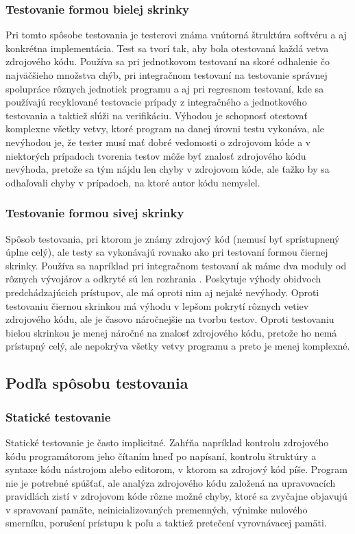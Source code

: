 \documentclass[11pt,twoside,slovak,a4paper]{article}
\begin{document}
		\subsubsection{Testovanie formou bielej skrinky} 
			Pri tomto spôsobe testovania je testerovi známa vnútorná štruktúra softvéru a aj konkrétna implementácia. Test sa tvorí tak, aby bola otestovaná každá vetva zdrojového kódu\cite{EST2002}. Používa sa pri jednotkovom testovaní na skoré odhalenie čo najväčšieho množstva chýb, pri integračnom testovaní na testovanie správnej spolupráce rôznych jednotiek programu a aj pri regresnom testovaní, kde sa používajú recyklované testovacie prípady z integračného a jednotkového testovania a taktiež slúži na verifikáciu. Výhodou je schopnosť otestovať komplexne všetky vetvy, ktoré program na danej úrovni testu vykonáva, ale nevýhodou je, že tester musí mať dobré vedomosti o zdrojovom kóde a v niektorých prípadoch tvorenia testov môže byť znalosť zdrojového kódu nevýhoda, pretože sa tým nájdu len chyby v zdrojovom kóde, ale ťažko by sa odhaľovali chyby v prípadoch, na ktoré autor kódu nemyslel.
		\subsubsection{Testovanie formou sivej skrinky} 
			Spôsob testovania, pri ktorom je známy zdrojový kód (nemusí byť sprístupnený úplne celý), ale testy sa vykonávajú rovnako ako pri testovaní formou čiernej skrinky. Používa sa napríklad pri integračnom testovaní ak máme dva moduly od rôznych vývojárov a odkryté sú len rozhrania \cite{EST2002}. Poskytuje výhody obidvoch predchádzajúcich prístupov, ale má oproti nim aj nejaké nevýhody. Oproti testovaniu čiernou skrinkou má výhodu v lepšom pokrytí rôznych vetiev zdrojového kódu, ale je časovo náročnejšie na tvorbu testov. Oproti testovaniu bielou skrinkou je menej náročné na znalosť zdrojového kódu, pretože ho nemá prístupný celý, ale nepokrýva všetky vetvy programu a preto je menej komplexné.
	
	\subsection{Podľa spôsobu testovania}
		\subsubsection{Statické testovanie}
			Statické testovanie je často implicitné. Zahŕňa napríklad kontrolu zdrojového kódu programátorom jeho čítaním hneď po napísaní, kontrolu štruktúry a syntaxe kódu nástrojom alebo editorom, v ktorom sa zdrojový kód píše. Program nie je potrebné spúšťať, ale analýza zdrojového kódu založená na upravovacích pravidlách zistí v zdrojovom kóde rôzne možné chyby, ktoré sa zvyčajne objavujú v spravovaní pamäte, neinicializovaných premenných, výnimke nulového smerníku, porušení prístupu k poľu a taktiež pretečení vyrovnávacej pamäti\cite{Wei2014}.
			
\end{document}
